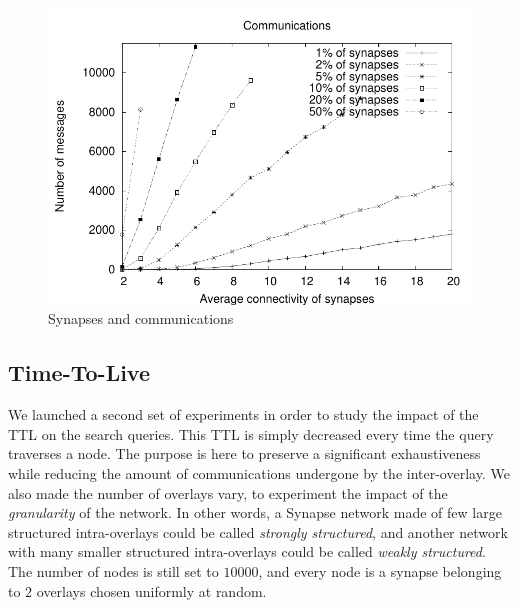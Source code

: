 %
\begin{figure}
        \includegraphics[width=\linewidth]{fig/3D-msgs.pdf}
        \caption{Synapses and communications\label{fig:3D-msgs}}
\end{figure}


\subsection{Time-To-Live}
%
We launched a second set of experiments in order to study the impact
of the TTL on the search queries. This TTL is simply decreased every
time the query traverses a node. The purpose is here to preserve a
significant exhaustiveness while reducing the amount of communications
undergone by the inter-overlay. We also made the number of overlays
vary, to experiment the impact of the \emph{granularity} of the
network. In other words, a Synapse network made of few large
structured intra-overlays could be called \emph{strongly structured},
and another network with many smaller structured intra-overlays could
be called \emph{weakly structured}. The number of nodes is still set
to $10000$, and every node is a synapse belonging to $2$ overlays
chosen uniformly at random.

